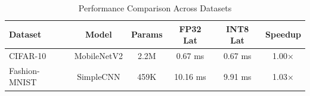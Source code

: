 \begin{table}[h]
\centering
\caption{Performance Comparison Across Datasets}
\label{tab:performance_comparison}
\begin{tabular}{lccccc}
\hline
\textbf{Dataset} & \textbf{Model} & \textbf{Params} & \textbf{FP32 Lat} & \textbf{INT8 Lat} & \textbf{Speedup} \\
\hline
CIFAR-10 & MobileNetV2 & 2.2M & 0.67 ms & 0.67 ms & 1.00$\times$ \\
Fashion-MNIST & SimpleCNN & 459K & 10.16 ms & 9.91 ms & 1.03$\times$ \\
\hline
\end{tabular}
\end{table}
